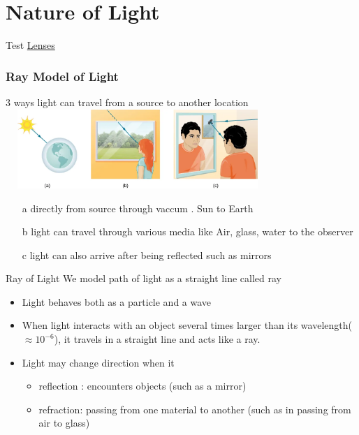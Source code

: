 \documentclass{beamer}
\title{}
\author{Nithin}
\institute{}
\date{\today}
\begin{document}
	\section{Nature of Light}
\begin{frame}{Test}
\href{https://www.youtube.com/watch_popup?v=xpcX3B4xE7Q}{Lenses}
\end{frame}

\begin{frame}
	
 \frametitle{Ray Model of Light}
 3 ways light can travel from a source to another location
 	\includegraphics[width=10cm,height=3cm]{1.png}
 \begin{enumerate}
 	\item[a] directly from source through vaccum . Sun to Earth
 	\item[b] light can travel through various media like Air, glass, water to the observer 
 	\item[c] light can also arrive after being reflected such as mirrors
 \end{enumerate}

\end{frame}
\begin{frame}
\begin{block}{Ray of Light}
	We model path of light as a straight line called \alert{ray}
\end{block}
\begin{itemize}
	\item Light behaves both as a particle and a wave
	\item When light interacts with an object several times larger than its wavelength($\approx 10^{-6}$), it travels in a straight line and acts like a ray.
	\item Light may change direction when it 
	\begin{itemize}
		\item reflection : encounters objects (such as a mirror) 
		\item refraction: passing from one material to another (such as in passing from air to glass) 
	\end{itemize}	
\end{itemize}
\end{frame}
\end{document}
